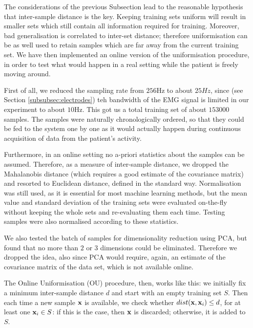 The considerations of the previous Subsection lead to the reasonable
hypothesis that inter-sample distance is the key. Keeping training
sets uniform will result in smaller sets which still contain all
information required for training. Moreover, bad generalisation is
correlated to inter-set distance; therefore uniformisation can be as
well used to retain samples which are far away from the current
training set. We have then implemented an online version of the
uniformisation procedure, in order to test what would happen in a real
setting while the patient is freely moving around.

First of all, we reduced the sampling rate from $256$Hz to about
$25Hz$, since (see Section \ref{subsubsec:electrodes}) teh bandwidth
of the EMG signal is limited in our experiment to about $10$Hz. This
got us a total training set of about $153000$ samples. The samples
were naturally chronologically ordered, so that they could be fed to
the system one by one as it would actually happen during continuous
acquisition of data from the patient's activity.

Furthermore, in an online setting no a-priori statistics about the
samples can be assumed. Therefore, as a measure of inter-sample
distance, we dropped the Mahalanobis distance (which requires a good
estimate of the covariance matrix) and resorted to Euclidean distance,
defined in the standard way. Normalisation was still used, as it is
essential for most machine learning methods, but the mean value and
standard deviation of the training sets were evaluated on-the-fly
without keeping the whole sets and re-evaluating them each
time. Testing samples were also normalised according to these
statistics.

We also tested the batch of samples for dimensionality reduction using
PCA, but found that no more than $2$ or $3$ dimensions could be
eliminated. Therefore we dropped the idea, also since PCA would
require, again, an estimate of the covariance matrix of the data set,
which is not available online.

The Online Uniformisation (OU) procedure, then, works like this: we
initially fix a minimum inter-sample distance $d$ and start
with an empty training set $S$. Then each time a new sample $\mathbf{x}$ is
available, we check whether $dist(\mathbf{x},\mathbf{x}_i)\leq d$, for at
least one $\mathbf{x}_i \in S$: if this is the case, then $\mathbf{x}$ is discarded;
otherwise, it is added to $S$.

